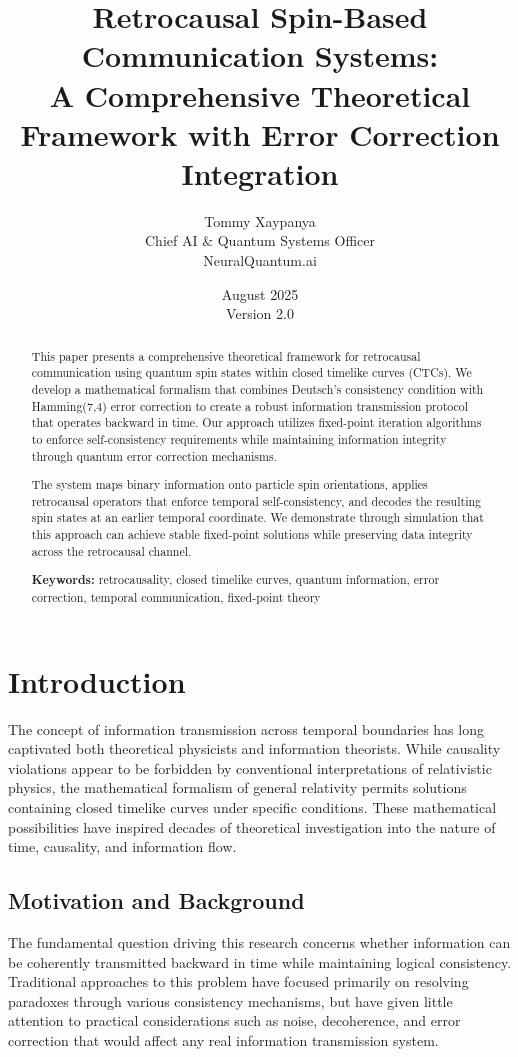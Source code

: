 \documentclass[12pt,a4paper]{article}
\title{\textbf{Retrocausal Spin-Based Communication Systems:\\A Comprehensive Theoretical Framework with Error Correction Integration}}
\author{Tommy Xaypanya\\Chief AI \& Quantum Systems Officer\\NeuralQuantum.ai}
\date{August 2025\\Version 2.0}
\begin{document}
\maketitle

\begin{abstract}
This paper presents a comprehensive theoretical framework for retrocausal communication using quantum spin states within closed timelike curves (CTCs). We develop a mathematical formalism that combines Deutsch's consistency condition with Hamming(7,4) error correction to create a robust information transmission protocol that operates backward in time. Our approach utilizes fixed-point iteration algorithms to enforce self-consistency requirements while maintaining information integrity through quantum error correction mechanisms.

The system maps binary information onto particle spin orientations, applies retrocausal operators that enforce temporal self-consistency, and decodes the resulting spin states at an earlier temporal coordinate. We demonstrate through simulation that this approach can achieve stable fixed-point solutions while preserving data integrity across the retrocausal channel.

\textbf{Keywords:} retrocausality, closed timelike curves, quantum information, error correction, temporal communication, fixed-point theory
\end{abstract}

\tableofcontents
\newpage

\section{Introduction}

The concept of information transmission across temporal boundaries has long captivated both theoretical physicists and information theorists. While causality violations appear to be forbidden by conventional interpretations of relativistic physics, the mathematical formalism of general relativity permits solutions containing closed timelike curves under specific conditions. These mathematical possibilities have inspired decades of theoretical investigation into the nature of time, causality, and information flow.

\subsection{Motivation and Background}

The fundamental question driving this research concerns whether information can be coherently transmitted backward in time while maintaining logical consistency. Traditional approaches to this problem have focused primarily on resolving paradoxes through various consistency mechanisms, but have given little attention to practical considerations such as noise, decoherence, and error correction that would affect any real information transmission system.
\end{document}
